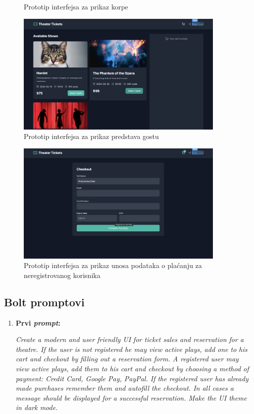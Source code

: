 \begin{itemize}
\begin{figure}[H]
    \caption{Prototip interfejsa za prikaz korpe}
    \label{fig:userfrontlist}
\end{figure}
\begin{figure}[H]
    \centering
    \includegraphics[width=0.9\textwidth]{Slike/FZ2ui/guesthome.png}
    \caption{Prototip interfejsa za prikaz predstava gostu}
    \label{fig:guesthome}
\end{figure}
\begin{figure}[H]
    \centering
    \includegraphics[width=0.9\textwidth]{Slike/FZ2ui/guestcheck.png}
    \caption{Prototip interfejsa za prikaz unosa podataka o plaćanju za neregistrovanog korisnika}
    \label{fig:questcheck}
\end{figure}
\subsection{Bolt promptovi}
\begin{enumerate}[itemsep=1ex]
    \item \textbf{Prvi \textit{prompt}:}

         \textit{ Create a modern and user friendly UI for ticket sales and reservation for a theatre. If the user is not registered he may view active plays, add one to his cart and checkout by filling out a reservation form. A registered user may view active plays, add them to his cart and checkout by choosing a method of payment: Credit Card, Google Pay, PayPal. If the registered user has already made purchases remember them and autofill the checkout. In all cases a message should be displayed for a successful reservation. Make the UI theme in dark mode.}


\end{enumerate}
\end{itemize}
